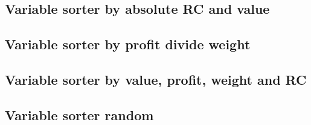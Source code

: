 \newpage
\subsection{Variable sorter by absolute RC and value}


\newpage
\subsection{Variable sorter by profit divide weight}


\newpage
\subsection{Variable sorter by value, profit, weight and RC}


\newpage
\subsection{Variable sorter random}
